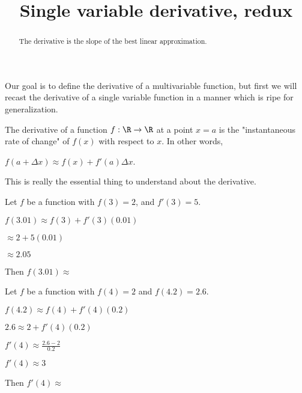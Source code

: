 \documentclass{ximera}
\title{Single variable derivative, redux}
\begin{document}
\begin{abstract}
The derivative is the slope of the best linear approximation.
\end{abstract}
	
	Our goal is to define the derivative of a multivariable function, but first we will recast the derivative of a single variable function in a
	manner which is ripe for generalization.
	
	The derivative of a function $f:\R \to \R$ at a point $x = a$ is the "instantaneous rate of change" of $f(x)$ with respect to $x$.
	In other words, 
	
	$f(a + \Delta x) \approx f(x) +f'(a)\Delta x$.
	
	This is really the essential thing to understand about the derivative.
	
	\begin{question}
		Let $f$ be a function with $f(3)  = 2$, and $f'(3) = 5$.
		\begin{solution}
			\begin{hint}
				$f(3.01) \approx f(3)+f'(3)(0.01)$
			\end{hint}
			\begin{hint}
				$\approx 2+5(0.01)$
			\end{hint}
			\begin{hint}
				$\approx 2.05$
			\end{hint}
			Then $f(3.01) \approx $ 
		\end{solution}
	\end{question}
	
	\begin{question}
		Let $f$ be a function with $f(4)=2$ and $f(4.2) = 2.6$.  
		
		\begin{solution}
			\begin{hint}
				$f(4.2) \approx f(4)+f'(4)(0.2)$
			\end{hint}
			\begin{hint}
				$2.6 \approx 2+f'(4)(0.2)$
			\end{hint}
			\begin{hint}
				$f'(4) \approx \frac{2.6 - 2}{0.2}$
			\end{hint}
			\begin{hint}
				$f'(4) \approx 3$
			\end{hint}
			Then $f'(4) \approx$ \answer{3}
		\end{solution}
	\end{question}
	
\end{document}
